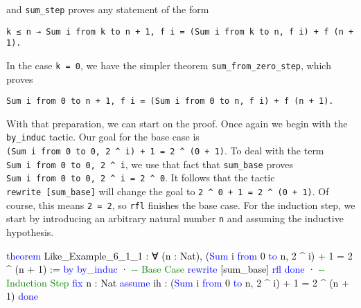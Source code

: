 \documentclass[
  letterpaper,
  DIV=11,
  numbers=noendperiod]{scrreprt}
\makeatletter
\newenvironment{Shaded}{\begin{snugshade}}{\end{snugshade}}
\newcommand{\CommentTok}[1]{\textcolor[rgb]{0.37,0.37,0.37}{#1}}
\newcommand{\KeywordTok}[1]{\textcolor[rgb]{0.00,0.23,0.31}{#1}}
\newcommand{\NormalTok}[1]{\textcolor[rgb]{0.00,0.23,0.31}{#1}}
\newcommand{\SpecialCharTok}[1]{\textcolor[rgb]{0.37,0.37,0.37}{#1}}
\newcommand{\WarningTok}[1]{\textcolor[rgb]{0.37,0.37,0.37}{\textit{#1}}}
\def\redsquiggly{\bgroup \markoverwith{\textcolor{red}{\lower3.5\p@\hbox{\sixly \char58}}}\ULon}
\renewcommand{\NormalTok}[1]{\textcolor[HTML]{000000}{#1}}
\renewcommand{\KeywordTok}[1]{\textcolor[HTML]{0000FF}{#1}}
\renewcommand{\SpecialCharTok}[1]{}
\renewcommand{\WarningTok}[1]{\redsquiggly{\textcolor[HTML]{0000FF}{#1}}}
\renewcommand{\CommentTok}[1]{\textcolor[HTML]{008000}{#1}}
\newenvironment{ind}
	{\begin{list}{}{\setlength{\leftmargin}{1em}}\item\relax}
	{\end{list}}
\theoremstyle{remark}
\makeatother
\begin{document}
and \texttt{sum\_step} proves any statement of the form

\begin{ind}

\begin{verbatim}
k ≤ n → Sum i from k to n + 1, f i = (Sum i from k to n, f i) + f (n + 1).
\end{verbatim}

\end{ind}

In the case \texttt{k\ =\ 0}, we have the simpler theorem
\texttt{sum\_from\_zero\_step}, which proves

\begin{ind}

\begin{verbatim}
Sum i from 0 to n + 1, f i = (Sum i from 0 to n, f i) + f (n + 1).
\end{verbatim}

\end{ind}

With that preparation, we can start on the proof. Once again we begin
with the \texttt{by\_induc} tactic. Our goal for the base case is
\texttt{(Sum\ i\ from\ 0\ to\ 0,\ 2\ \^{}\ i)\ +\ 1\ =\ 2\ \^{}\ (0\ +\ 1)}.
To deal with the term \texttt{Sum\ i\ from\ 0\ to\ 0,\ 2\ \^{}\ i}, we
use that fact that \texttt{sum\_base} proves
\texttt{Sum\ i\ from\ 0\ to\ 0,\ 2\ \^{}\ i\ =\ 2\ \^{}\ 0}. It follows
that the tactic \texttt{rewrite\ {[}sum\_base{]}} will change the goal
to \texttt{2\ \^{}\ 0\ +\ 1\ =\ 2\ \^{}\ (0\ +\ 1)}. Of course, this
means \texttt{2\ =\ 2}, so \texttt{rfl} finishes the base case. For the
induction step, we start by introducing an arbitrary natural number
\texttt{n} and assuming the inductive hypothesis.

\begin{Shaded}
\begin{Highlighting}[]
\KeywordTok{theorem}\NormalTok{ Like\_Example\_6\_1\_1 :}
\NormalTok{    ∀ (n : Nat), (}\KeywordTok{Sum}\NormalTok{ i }\KeywordTok{from}\NormalTok{ 0 }\KeywordTok{to}\NormalTok{ n, 2 \^{} i) + 1 = 2 \^{} (n + 1) := }\KeywordTok{by}
  \KeywordTok{by\_induc}
\NormalTok{  · }\CommentTok{{-}{-} Base Case}
    \KeywordTok{rewrite}\NormalTok{ [sum\_base]}
    \KeywordTok{rfl}
    \KeywordTok{done}
\NormalTok{  · }\CommentTok{{-}{-} Induction Step}
    \KeywordTok{fix}\NormalTok{ n : Nat}
    \KeywordTok{assume}\NormalTok{ ih : (}\KeywordTok{Sum}\NormalTok{ i }\KeywordTok{from}\NormalTok{ 0 }\KeywordTok{to}\NormalTok{ n, 2 \^{} i) + 1 = 2 \^{} (n + 1)}
    \SpecialCharTok{**}\WarningTok{done}\SpecialCharTok{::}
  \KeywordTok{done}
\end{Highlighting}
\end{Shaded}
\end{document}
